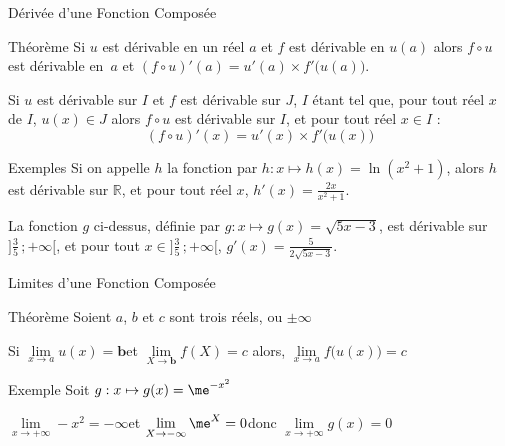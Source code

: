 \documentclass{cours}
\begin{document}
    \begin{Gpartie}{Dérivée d'une Fonction Composée} 
        \begin{Spartie}{Théorème} 
            Si $u$ est dérivable en un réel $a$ et $f$ est dérivable en $u(a)$ alors $f\circ u$ est dérivable en~$a$ et $(f\circ u)'(a)=u'(a)\times f'\big(u(a)\big)$.

            Si $u$ est dérivable sur $I$ et $f$ est dérivable sur $J$, $I$ étant tel que, pour tout réel $x$ de $I$, $u(x)\in J$ alors $f\circ u$ est dérivable sur $I$, et pour tout réel $x\in I$ : \[\boxed{(f\circ u)'(x)=u'(x)\times f'\big(u(x)\big)}\] 
        \end{Spartie}
        \begin{Spartie}{Exemples} 
            Si on appelle $h$ la fonction par $h:x\mapsto h(x)=\ln(x^2+1)$, alors $h$ est dérivable sur $\mathbb{R}$, et pour tout réel $x$, $h'(x)=\frac{2x}{x^2+1}$.

            La fonction $g$ ci-dessus, définie par $g:x\mapsto g(x)=\sqrt{5x-3}$, est dérivable sur~$\Big]\frac{3}{5}\,;+\infty\Big[$, et pour tout $x\in\Big]\frac{3}{5}\,;+\infty\Big[$, $g'(x)=\frac{5}{2\sqrt{5x-3}}$.
        \end{Spartie}
    \end{Gpartie}
    \begin{Gpartie}{Limites d'une Fonction Composée} 
        \begin{Spartie}{Théorème} 
            Soient $a$, $b$ et $c$ sont trois réels, ou $\pm\infty$

            Si \qquad$\lim\limits_{x\to a}u(x)=\boldsymbol{b}$\qquad et \qquad $\lim\limits_{X\to \boldsymbol{b}}f(X)=c$ \qquad alors, \qquad $\boxed{\lim\limits_{x\to a}f\big(u(x)\big)=c}$
        \end{Spartie}
        \begin{Spartie}{Exemple} 
            Soit $g:x\mapsto g(x)=\me^{-x^2}$

            $\lim\limits_{x\to +\infty} -x^2=-\infty$\qquad et \qquad$\lim\limits_{X\to -\infty} \me^X=0$\qquad donc \qquad$\lim\limits_{x\to +\infty}g(x)=0$
        \end{Spartie}
    \end{Gpartie}
\end{document}
